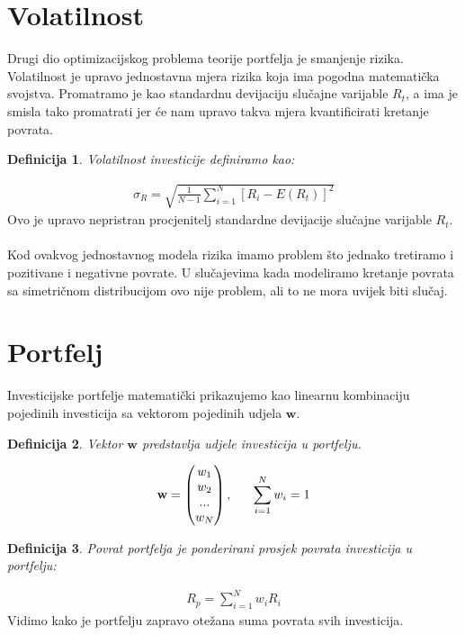 \documentclass[zavrsnirad]{fer}
\newtheorem{definition}{Definicija}
\begin{document}
\section{Volatilnost}
Drugi dio optimizacijskog problema teorije portfelja je smanjenje rizika.
Volatilnost je upravo jednostavna mjera rizika koja ima pogodna matematička svojstva.
Promatramo je kao standardnu devijaciju slučajne varijable $R_t$, a ima je smisla tako promatrati
jer će nam upravo takva mjera kvantificirati kretanje povrata.
\begin{definition}
  Volatilnost investicije definiramo kao:
\end{definition}
\begin{align*}
  \sigma_R = \sqrt{\frac{1}{N - 1} \sum_{i = 1}^{N} \left[R_i - E(R_t)\right]^2}
\end{align*}
\indent Ovo je upravo nepristran procjenitelj standardne devijacije slučajne varijable $R_t$.
\\
\\
Kod ovakvog jednostavnog modela rizika imamo problem što jednako tretiramo i pozitivane i negativne povrate.
U slučajevima kada modeliramo kretanje povrata sa simetričnom distribucijom ovo nije problem, ali to ne mora uvijek biti slučaj.

\section{Portfelj}
Investicijske portfelje matematički prikazujemo kao linearnu kombinaciju
pojedinih investicija sa vektorom pojedinih udjela $\mathbf{w}$.
\begin{definition}
  Vektor $\mathbf{w}$ predstavlja udjele investicija u portfelju.
\end{definition}
\begin{align*}
  \mathbf{w} = \begin{pmatrix} w_1 \\ w_2 \\ ... \\ w_N \end{pmatrix},
  \indent \sum_{i = 1}^{N} w_i = 1
\end{align*}

\begin{definition}
  Povrat portfelja je ponderirani prosjek povrata investicija u portfelju:
\end{definition}
\begin{align*}
  R_p = \sum_{i = 1}^{N} w_i R_i
\end{align*}
\indent Vidimo kako je portfelju zapravo otežana suma povrata svih investicija.
\end{document}
